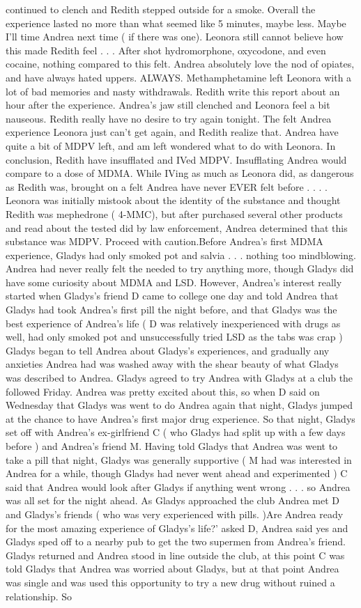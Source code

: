 \documentclass[12pt]{book}
\begin{document}
continued to clench and Redith stepped outside for a smoke. Overall the experience lasted no more than what seemed like 5 minutes, maybe less. Maybe I'll time Andrea next time ( if there was one). Leonora still cannot believe how this made Redith feel . . .  After shot hydromorphone, oxycodone, and even cocaine, nothing compared to this felt. Andrea absolutely love the nod of opiates, and have always hated uppers. ALWAYS. Methamphetamine left Leonora with a lot of bad memories and nasty withdrawals. Redith write this report about an hour after the experience. Andrea's jaw still clenched and Leonora feel a bit nauseous. Redith really have no desire to try again tonight. The felt Andrea experience Leonora just can't get again, and Redith realize that. Andrea have quite a bit of MDPV left, and am left wondered what to do with Leonora. In conclusion, Redith have insufflated and IVed MDPV. Insufflating Andrea would compare to a dose of MDMA. While IVing as much as Leonora did, as dangerous as Redith was, brought on a felt Andrea have never EVER felt before . . .  . Leonora was initially mistook about the identity of the substance and thought Redith was mephedrone ( 4-MMC), but after purchased several other products and read about the tested did by law enforcement, Andrea determined that this substance was MDPV. Proceed with caution.Before Andrea's first MDMA experience, Gladys had only smoked pot and salvia . . .  nothing too mindblowing. Andrea had never really felt the needed to try anything more, though Gladys did have some curiosity about MDMA and LSD. However, Andrea's interest really started when Gladys's friend D came to college one day and told Andrea that Gladys had took Andrea's first pill the night before, and that Gladys was the best experience of Andrea's life ( D was relatively inexperienced with drugs as well, had only smoked pot and unsuccessfully tried LSD as the tabs was crap ) Gladys began to tell Andrea about Gladys's experiences, and gradually any anxieties Andrea had was washed away with the shear beauty of what Gladys was described to Andrea. Gladys agreed to try Andrea with Gladys at a club the followed Friday. Andrea was pretty excited about this, so when D said on Wednesday that Gladys was went to do Andrea again that night, Gladys jumped at the chance to have Andrea's first major drug experience. So that night, Gladys set off with Andrea's ex-girlfriend C ( who Gladys had split up with a few days before ) and Andrea's friend M. Having told Gladys that Andrea was went to take a pill that night, Gladys was generally supportive ( M had was interested in Andrea for a while, though Gladys had never went ahead and experimented ) C said that Andrea would look after Gladys if anything went wrong . . .  so Andrea was all set for the night ahead. As Gladys approached the club Andrea met D and Gladys's friends ( who was very experienced with pills. )Are Andrea ready for the most amazing experience of Gladys's life?' asked D, Andrea said yes and Gladys sped off to a nearby pub to get the two supermen from Andrea's friend. Gladys returned and Andrea stood in line outside the club, at this point C was told Gladys that Andrea was worried about Gladys, but at that point Andrea was single and was used this opportunity to try a new drug without ruined a relationship. So 
\end{document}
